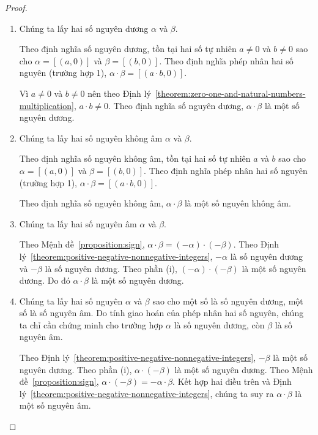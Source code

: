 \begin{proof}
    \begin{enumerate}[label={(\roman*)}]
        \item Chúng ta lấy hai số nguyên dương $\alpha$ và $\beta$.

              Theo định nghĩa số nguyên dương, tồn tại hai số tự nhiên $a\ne 0$ và $b\ne 0$ sao cho $\alpha = [(a,0)]$ và $\beta = [(b,0)]$. Theo định nghĩa phép nhân hai số nguyên (trường hợp 1), $\alpha\cdot\beta = [(a\cdot b, 0)]$.

              Vì $a\ne 0$ và $b\ne 0$ nên theo Định lý~\ref{theorem:zero-one-and-natural-numbers-multiplication}, $a\cdot b\ne 0$. Theo định nghĩa số nguyên dương, $\alpha\cdot\beta$ là một số nguyên dương.
        \item Chúng ta lấy hai số nguyên không âm $\alpha$ và $\beta$.

              Theo định nghĩa số nguyên không âm, tồn tại hai số tự nhiên $a$ và $b$ sao cho $\alpha = [(a,0)]$ và $\beta = [(b,0)]$. Theo định nghĩa phép nhân hai số nguyên (trường hợp 1), $\alpha\cdot\beta = [(a\cdot b, 0)]$.

              Theo định nghĩa số nguyên không âm, $\alpha\cdot\beta$ là một số nguyên không âm.
        \item Chúng ta lấy hai số nguyên âm $\alpha$ và $\beta$.

              Theo Mệnh đề~\ref{proposition:sign}, $\alpha\cdot\beta = (-\alpha)\cdot(-\beta)$. Theo Định lý~\ref{theorem:positive-negative-nonnegative-integers}, $-\alpha$ là số nguyên dương và $-\beta$ là số nguyên dương. Theo phần (i), $(-\alpha)\cdot(-\beta)$ là một số nguyên dương. Do đó $\alpha\cdot\beta$ là một số nguyên dương.
        \item Chúng ta lấy hai số nguyên $\alpha$ và $\beta$ sao cho một số là số nguyên dương, một số là số nguyên âm. Do tính giao hoán của phép nhân hai số nguyên, chúng ta chỉ cần chứng minh cho trường hợp $\alpha$ là số nguyên dương, còn $\beta$ là số nguyên âm.

              Theo Định lý~\ref{theorem:positive-negative-nonnegative-integers}, $-\beta$ là một số nguyên dương. Theo phần (i), $\alpha\cdot(-\beta)$ là một số nguyên dương. Theo Mệnh đề~\ref{proposition:sign}, $\alpha\cdot(-\beta) = -\alpha\cdot\beta$. Kết hợp hai điều trên và Định lý~\ref{theorem:positive-negative-nonnegative-integers}, chúng ta suy ra $\alpha\cdot\beta$ là một số nguyên âm.
    \end{enumerate}
\end{proof}

